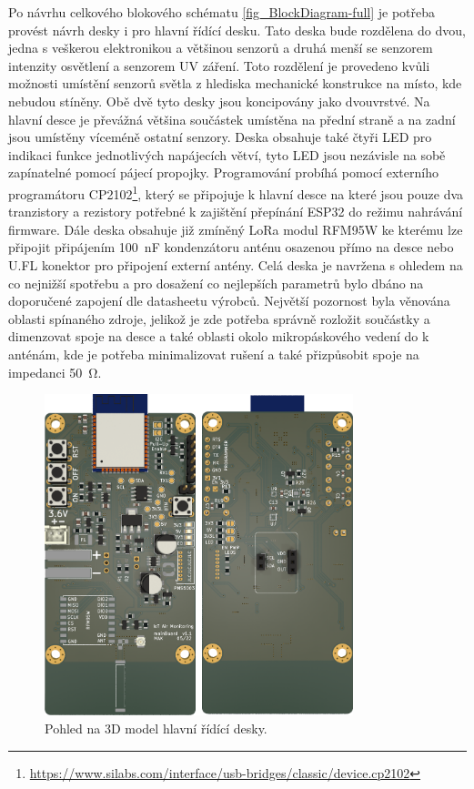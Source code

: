 Po návrhu celkového blokového schématu \ref{fig_BlockDiagram-full} je potřeba provést návrh desky i pro hlavní řídící desku. Tato deska bude rozdělena do dvou, jedna s veškerou elektronikou a většinou senzorů a druhá menší se senzorem intenzity osvětlení a senzorem UV záření. Toto rozdělení je provedeno kvůli možnosti umístění senzorů světla z hlediska mechanické konstrukce na místo, kde nebudou stíněny. Obě dvě tyto desky jsou koncipovány jako dvouvrstvé. Na hlavní desce je převážná většina součástek umístěna na přední straně a na zadní jsou umístěny víceméně ostatní senzory. Deska obsahuje také čtyři LED pro indikaci funkce jednotlivých napájecích větví, tyto LED jsou nezávisle na sobě zapínatelné pomocí pájecí propojky. Programování probíhá pomocí externího programátoru CP2102\footnote{\url{https://www.silabs.com/interface/usb-bridges/classic/device.cp2102}}, který se připojuje k hlavní desce na které jsou pouze dva tranzistory a rezistory potřebné k zajištění přepínání ESP32 do režimu nahrávání firmware. Dále deska obsahuje již zmíněný LoRa modul RFM95W ke kterému lze připojit připájením \SI{100}{\nano\farad} kondenzátoru anténu osazenou přímo na desce nebo U.FL konektor pro připojení externí antény. Celá deska je navržena s ohledem na co nejnižší spotřebu a pro dosažení co nejlepších parametrů bylo dbáno na doporučené zapojení dle datasheetu výrobců. Největší pozornost byla věnována oblasti spínaného zdroje, jelikož je zde potřeba správně rozložit součástky a dimenzovat spoje na desce a také oblasti okolo mikropáskového vedení do k anténám, kde je potřeba minimalizovat rušení a také přizpůsobit spoje na impedanci \SI{50}{\ohm}.

\begin{figure}
    \centering
    \includegraphics[width=0.8\textwidth]{obrazky/mainBoard-kicad.png}
    \caption{Pohled na 3D model hlavní řídící desky.}
    \label{fig_mainBoardKicadRender}
\end{figure}

